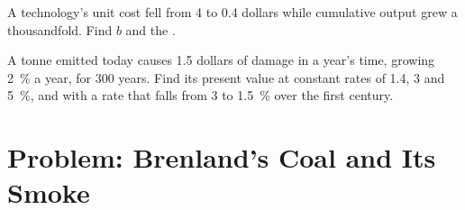 \begin{exercise}[$\star\star\star$]\label{exo:b3:environmental-and-resource-economics:11}
A technology's unit cost fell from 4 to 0.4 dollars while cumulative output grew a thousandfold. Find $b$ and the
.
\end{exercise}

\begin{exercise}[$\star\star\star$]\label{exo:b3:environmental-and-resource-economics:12}
A tonne emitted today causes 1.5 dollars of damage in a year's time, growing 2~\% a year, for 300 years. Find its
present value at constant rates of 1.4, 3 and 5~\%, and with a rate that falls from 3 to 1.5~\% over the first
century.
\end{exercise}

\section{Problem: Brenland's Coal and Its Smoke}\label{sec:b3:environmental-and-resource-economics:problem}

